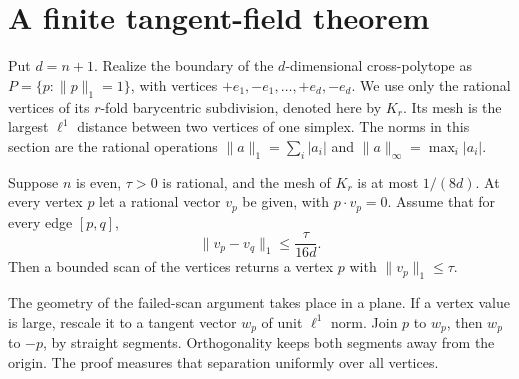 \section{A finite tangent-field theorem}\label{sec:table}

Put $d=n+1$. Realize the boundary of the $d$-dimensional
cross-polytope as $P=\{p:\|p\|_1=1\}$, with vertices
$+e_1,-e_1,\ldots,+e_d,-e_d$. We use only the rational vertices
of its $r$-fold barycentric subdivision, denoted here by $K_r$.
Its mesh is the largest $\ell^1$ distance between two vertices of one
simplex. The norms in this section are the rational operations
$\|a\|_1=\sum_i|a_i|$ and $\|a\|_\infty=\max_i|a_i|$.

\begin{theorem}\label{thm:finite-table}
Suppose $n$ is even, $\tau>0$ is rational, and the mesh of $K_r$ is
at most $1/(8d)$. At every vertex $p$ let a rational vector $v_p$
be given, with $p\cdot v_p=0$. Assume that for every edge $[p,q]$,
\[
             \|v_p-v_q\|_1\leq \frac{\tau}{16d}.
\]
Then a bounded scan of the vertices returns a vertex $p$ with
$\|v_p\|_1\leq\tau$.
\end{theorem}

The geometry of the failed-scan argument takes place in a plane. If a
vertex value is large, rescale it to a tangent vector $w_p$ of unit
$\ell^1$ norm. Join $p$ to $w_p$, then $w_p$ to $-p$, by straight
segments. Orthogonality keeps both segments away from the origin.
The proof measures that separation uniformly over all vertices.
\begin{center}
\end{center}

